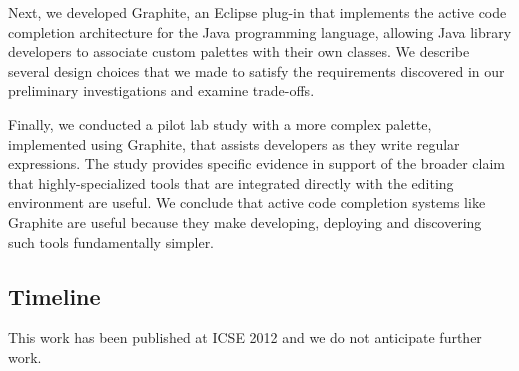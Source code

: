 \begin{contribution}
Next, we developed Graphite, an Eclipse plug-in that implements the active code completion architecture for the Java programming language, allowing Java library developers to associate custom palettes with their own classes. We describe several design choices that we made to satisfy the requirements discovered in our preliminary investigations and examine trade-offs. 
\end{contribution}

\begin{contribution}
Finally, we conducted a pilot lab study with a more complex palette, implemented using Graphite, that assists developers as they write regular expressions. The study provides specific evidence in support of the broader claim that highly-specialized tools that are integrated directly with the editing environment are  useful. We conclude that active code completion systems like Graphite are useful because they make developing, deploying and discovering such tools fundamentally simpler.
\end{contribution}


\subsection{Timeline}
This work has been published at ICSE 2012 \cite{Omar:2012:ACC:2337223.2337324} and we do not anticipate further work.%


